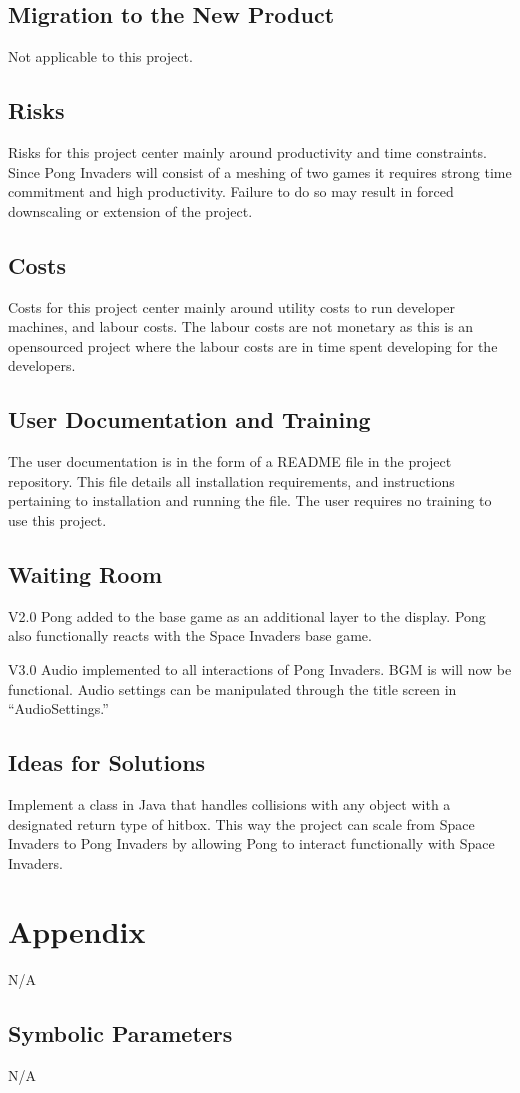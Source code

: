 \documentclass[12pt, titlepage]{article}
\begin{document}
\subsection{Migration to the New Product}
Not applicable to this project.

\subsection{Risks}
Risks for this project center mainly around productivity and time constraints.
Since Pong Invaders will consist of a meshing of two games it requires strong
time commitment and high productivity. Failure to do so may result in forced
downscaling or extension of the project.

\subsection{Costs}
Costs for this project center mainly around utility costs to run developer
machines, and labour costs. The labour costs are not monetary as this is an
opensourced project where the labour costs are in time spent developing for the
developers.

\subsection{User Documentation and Training}
The user documentation is in the form of a README file in the project
repository. This file details all installation requirements, and instructions
pertaining to installation and running the file. The user requires no training
to use this project.

\subsection{Waiting Room}
V2.0 Pong added to the base game as an additional layer to the display. Pong
also functionally reacts with the Space Invaders base game.

V3.0 Audio implemented to all interactions of Pong Invaders. BGM is will now be
functional. Audio settings can be manipulated through the title screen in
“AudioSettings.”

\subsection{Ideas for Solutions}
Implement a class in Java that handles collisions with any object with a
designated return type of hitbox. This way the project can scale from Space
Invaders to Pong Invaders by allowing Pong to interact functionally with Space
Invaders.



\newpage
\section{Appendix}
N/A
\subsection{Symbolic Parameters}
N/A
\end{document}

